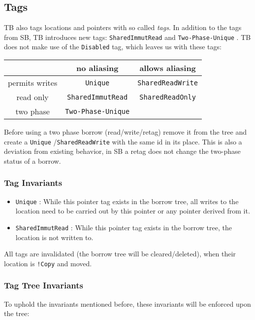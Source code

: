 \documentclass[]{article}
\newcommand{\SHRW}{\texttt{SharedReadWrite} }
\newcommand{\SHRO}{\texttt{SharedReadOnly} }
\newcommand{\SHIR}{\texttt{SharedImmutRead} }
\newcommand{\UNQ}{\texttt{Unique} }
\newcommand{\TPU}{\texttt{Two-Phase-Unique} }
\begin{document}
\subsection{Tags}
TB also tags locations and pointers with so called \textit{tags}.
In addition to the tags from SB, TB introduces new tags: \SHIR and \TPU.
TB does not make use of the \texttt{Disabled} tag, which leaves us with these tags:
\begin{center}
\begin{tabular}{c|c|c}
    & no aliasing & allows aliasing \\
    \hline
    permits writes & \UNQ & \SHRW \\
    \hline
    read only & \SHIR & \SHRO \\
    \hline
    two phase & \TPU
\end{tabular}
\end{center}

Before using a two phase borrow (read/write/retag) remove it from the tree and create a \UNQ/\SHRW with the same id in its place.
This is also a deviation from existing behavior, in SB a retag does not change the two-phase status of a borrow.

\subsubsection{Tag Invariants}

\begin{itemize}
    \item \UNQ: While this pointer tag exists in the borrow tree, all writes to the location need to be carried out by this pointer or any pointer derived from it.
    \item \SHIR: While this pointer tag exists in the borrow tree, the location is not written to.
\end{itemize}
All tags are invalidated (the borrow tree will be cleared/deleted), when their location is \texttt{!Copy} and moved.


\subsubsection{Tag Tree Invariants}
To uphold the invariants mentioned before, these invariants will be enforced upon the tree:
\end{document}
